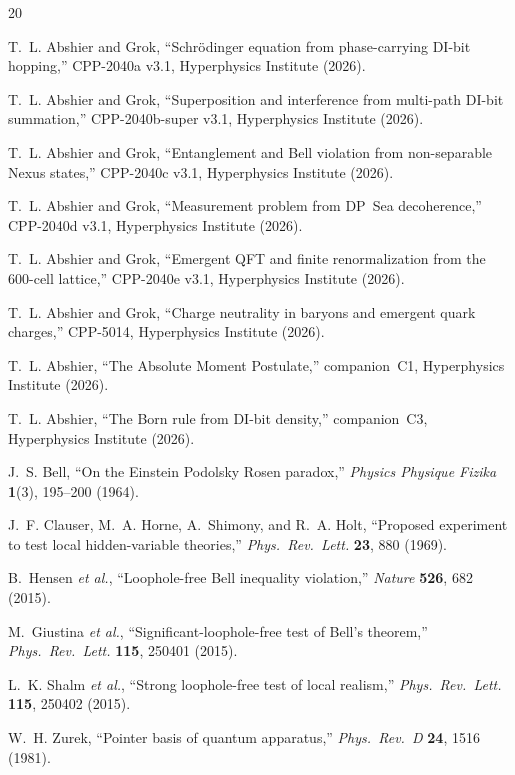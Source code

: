 \documentclass[11pt,a4paper]{article}
\begin{document}
\begin{thebibliography}{20}

T.~L. Abshier and Grok,
``Schr\"{o}dinger equation from phase-carrying DI-bit hopping,''
CPP-2040a v3.1, Hyperphysics Institute (2026).

T.~L. Abshier and Grok,
``Superposition and interference from multi-path DI-bit summation,''
CPP-2040b-super v3.1, Hyperphysics Institute (2026).

T.~L. Abshier and Grok,
``Entanglement and Bell violation from non-separable Nexus states,''
CPP-2040c v3.1, Hyperphysics Institute (2026).

T.~L. Abshier and Grok,
``Measurement problem from DP~Sea decoherence,''
CPP-2040d v3.1, Hyperphysics Institute (2026).

T.~L. Abshier and Grok,
``Emergent QFT and finite renormalization from the 600-cell lattice,''
CPP-2040e v3.1, Hyperphysics Institute (2026).

T.~L. Abshier and Grok,
``Charge neutrality in baryons and emergent quark charges,''
CPP-5014, Hyperphysics Institute (2026).

T.~L. Abshier,
``The Absolute Moment Postulate,''
companion~C1, Hyperphysics Institute (2026).

T.~L. Abshier,
``The Born rule from DI-bit density,''
companion~C3, Hyperphysics Institute (2026).

J.~S. Bell,
``On the Einstein Podolsky Rosen paradox,''
\textit{Physics Physique Fizika} \textbf{1}(3), 195--200 (1964).

J.~F. Clauser, M.~A. Horne, A.~Shimony, and R.~A. Holt,
``Proposed experiment to test local hidden-variable theories,''
\textit{Phys.\ Rev.\ Lett.} \textbf{23}, 880 (1969).

B.~Hensen \textit{et al.},
``Loophole-free Bell inequality violation,''
\textit{Nature} \textbf{526}, 682 (2015).

M.~Giustina \textit{et al.},
``Significant-loophole-free test of Bell's theorem,''
\textit{Phys.\ Rev.\ Lett.} \textbf{115}, 250401 (2015).

L.~K. Shalm \textit{et al.},
``Strong loophole-free test of local realism,''
\textit{Phys.\ Rev.\ Lett.} \textbf{115}, 250402 (2015).

W.~H. Zurek,
``Pointer basis of quantum apparatus,''
\textit{Phys.\ Rev.\ D} \textbf{24}, 1516 (1981).


\end{thebibliography}
\end{document}
